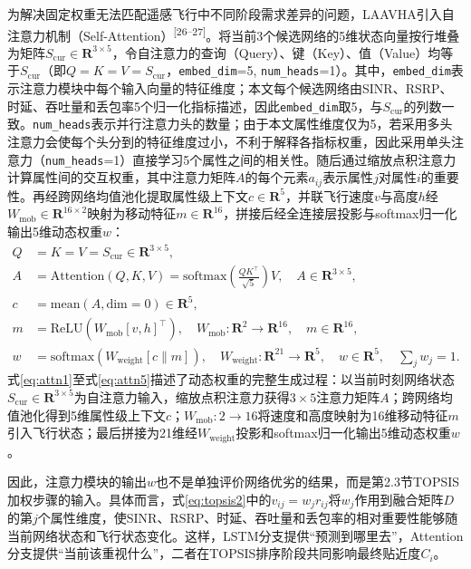\documentclass[10pt,a4paper]{ctexart}
\newcommand{\upcite}[1]{\textsuperscript{[#1]}}
\begin{document}
为解决固定权重无法匹配遥感飞行中不同阶段需求差异的问题，LAAVHA引入自注意力机制（Self-Attention）\upcite{26--27}。将当前3个候选网络的5维状态向量按行堆叠为矩阵$S_{\mathrm{cur}}\in\mathbf{R}^{3\times5}$，令自注意力的查询（Query）、键（Key）、值（Value）均等于$S_{\mathrm{cur}}$（即$Q=K=V=S_{\mathrm{cur}}$，\texttt{embed\_dim}=5, \texttt{num\_heads}=1）。其中，\texttt{embed\_dim}表示注意力模块中每个输入向量的特征维度；本文每个候选网络由SINR、RSRP、时延、吞吐量和丢包率5个归一化指标描述，因此\texttt{embed\_dim}取5，与$S_{\mathrm{cur}}$的列数一致。\texttt{num\_heads}表示并行注意力头的数量；由于本文属性维度仅为5，若采用多头注意力会使每个头分到的特征维度过小，不利于解释各指标权重，因此采用单头注意力（\texttt{num\_heads}=1）直接学习5个属性之间的相关性。随后通过缩放点积注意力计算属性间的交互权重，其中注意力矩阵$A$的每个元素$a_{ij}$表示属性$j$对属性$i$的重要性。再经跨网络均值池化提取属性级上下文$c\in\mathbf{R}^5$，并联飞行速度$v$与高度$h$经$W_{\mathrm{mob}}\in\mathbf{R}^{16\times2}$映射为移动特征$m\in\mathbf{R}^{16}$，拼接后经全连接层投影与softmax归一化输出5维动态权重$w$：
\begin{align}
Q &= K = V = S_{\mathrm{cur}}\in\mathbf{R}^{3\times5}, \label{eq:attn1}\\
A &= \mathrm{Attention}(Q,K,V)=\mathrm{softmax}\!\left(\frac{QK^\top}{\sqrt{5}}\right)V,\quad A\in\mathbf{R}^{3\times5}, \label{eq:attn2}\\
c &= \mathrm{mean}(A,\mathrm{dim}=0)\in\mathbf{R}^5, \label{eq:attn3}\\
m &= \mathrm{ReLU}\!\left(W_{\mathrm{mob}}[v,h]^\top\right),\quad W_{\mathrm{mob}}:\mathbf{R}^{2}\rightarrow\mathbf{R}^{16},\quad m\in\mathbf{R}^{16}, \label{eq:attn4}\\
w &= \mathrm{softmax}\!\left(W_{\mathrm{weight}}[c\parallel m]\right),\quad W_{\mathrm{weight}}:\mathbf{R}^{21}\rightarrow\mathbf{R}^{5},\quad w\in\mathbf{R}^{5},\quad \sum_j w_j=1. \label{eq:attn5}
\end{align}
式\eqref{eq:attn1}至式\eqref{eq:attn5}描述了动态权重的完整生成过程：以当前时刻网络状态$S_{\mathrm{cur}}\in\mathbf{R}^{3\times5}$为自注意力输入，缩放点积注意力获得$3\times5$注意力矩阵$A$；跨网络均值池化得到5维属性级上下文$c$；$W_{\mathrm{mob}}:2\rightarrow16$将速度和高度映射为16维移动特征$m$引入飞行状态；最后拼接为21维经$W_{\mathrm{weight}}$投影和softmax归一化输出5维动态权重$w$。

因此，注意力模块的输出$w$也不是单独评价网络优劣的结果，而是第2.3节TOPSIS加权步骤的输入。具体而言，式\eqref{eq:topsis2}中的$v_{ij}=w_j r_{ij}$将$w_j$作用到融合矩阵$D$的第$j$个属性维度，使SINR、RSRP、时延、吞吐量和丢包率的相对重要性能够随当前网络状态和飞行状态变化。这样，LSTM分支提供``预测到哪里去''，Attention分支提供``当前该重视什么''，二者在TOPSIS排序阶段共同影响最终贴近度$C_i$。
\end{document}
